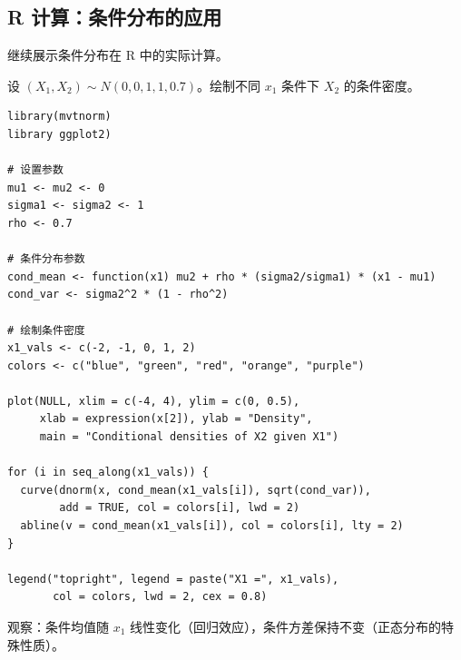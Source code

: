 
\subsection{R 计算：条件分布的应用}

继续展示条件分布在 R 中的实际计算。

\begin{example}[二元正态条件分布可视化]\label{ex:bivariate-normal-conditional-visualization-ch2}
设 $(X_1, X_2) \sim N(0, 0, 1, 1, 0.7)$。绘制不同 $x_1$ 条件下 $X_2$ 的条件密度。

\begin{verbatim}
library(mvtnorm)
library ggplot2)

# 设置参数
mu1 <- mu2 <- 0
sigma1 <- sigma2 <- 1
rho <- 0.7

# 条件分布参数
cond_mean <- function(x1) mu2 + rho * (sigma2/sigma1) * (x1 - mu1)
cond_var <- sigma2^2 * (1 - rho^2)

# 绘制条件密度
x1_vals <- c(-2, -1, 0, 1, 2)
colors <- c("blue", "green", "red", "orange", "purple")

plot(NULL, xlim = c(-4, 4), ylim = c(0, 0.5),
     xlab = expression(x[2]), ylab = "Density",
     main = "Conditional densities of X2 given X1")

for (i in seq_along(x1_vals)) {
  curve(dnorm(x, cond_mean(x1_vals[i]), sqrt(cond_var)),
        add = TRUE, col = colors[i], lwd = 2)
  abline(v = cond_mean(x1_vals[i]), col = colors[i], lty = 2)
}

legend("topright", legend = paste("X1 =", x1_vals),
       col = colors, lwd = 2, cex = 0.8)
\end{verbatim}

观察：条件均值随 $x_1$ 线性变化（回归效应），条件方差保持不变（正态分布的特殊性质）。
\end{example}

